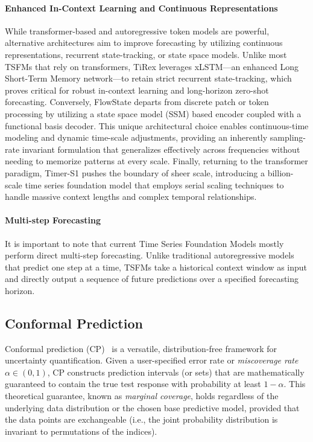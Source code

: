 \documentclass[12pt, a4paper]{article}
\begin{document}
\paragraph{Enhanced In-Context Learning and Continuous Representations}
While transformer-based and autoregressive token models are powerful, alternative architectures aim to improve forecasting by utilizing continuous representations, recurrent state-tracking, or state space models. Unlike most TSFMs that rely on transformers, TiRex \cite{tirex} leverages xLSTM---an enhanced Long Short-Term Memory network---to retain strict recurrent state-tracking, which proves critical for robust in-context learning and long-horizon zero-shot forecasting. Conversely, FlowState \cite{flowstate} departs from discrete patch or token processing by utilizing a state space model (SSM) based encoder coupled with a functional basis decoder. This unique architectural choice enables continuous-time modeling and dynamic time-scale adjustments, providing an inherently sampling-rate invariant formulation that generalizes effectively across frequencies without needing to memorize patterns at every scale. Finally, returning to the transformer paradigm, Timer-S1 \cite{timer-s1} pushes the boundary of sheer scale, introducing a billion-scale time series foundation model that employs serial scaling techniques to handle massive context lengths and complex temporal relationships.

\paragraph{Multi-step Forecasting}
It is important to note that current Time Series Foundation Models mostly perform direct multi-step forecasting. Unlike traditional autoregressive models that predict one step at a time, TSFMs take a historical context window as input and directly output a sequence of future predictions over a specified forecasting horizon.

\subsection{Conformal Prediction}
Conformal prediction (CP)~\cite{vovk2005algorithmic} is a versatile, distribution-free framework for uncertainty quantification. Given a user-specified error rate or \textit{miscoverage rate} \(\alpha \in (0,1)\), CP constructs prediction intervals (or sets) that are mathematically guaranteed to contain the true test response with probability at least \(1-\alpha\). This theoretical guarantee, known as \textit{marginal coverage}, holds regardless of the underlying data distribution or the chosen base predictive model, provided that the data points are exchangeable (i.e., the joint probability distribution is invariant to permutations of the indices).
\end{document}
